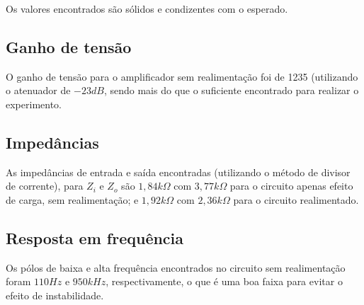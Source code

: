 \documentclass[openright]{normas-utf-tex} %
\begin{document}
Os valores encontrados são sólidos e condizentes com o esperado.

\subsection{Ganho de tensão}
\label{sec:ganho_tensao_transc}
O ganho de tensão para o amplificador sem realimentação foi de 1235 (utilizando o atenuador de $-23dB$, sendo mais do que o suficiente encontrado para realizar o experimento.

\subsection{Impedâncias}
As impedâncias de entrada e saída encontradas (utilizando o método de divisor de corrente), para $Z_i$ e $Z_o$ são $1,84k\Omega$ com $3,77k\Omega$ para o circuito apenas efeito de carga, sem realimentação; e $1,92k\Omega$ com $2,36k\Omega$ para o circuito realimentado.

\subsection{Resposta em frequência}
Os pólos de baixa e alta frequência encontrados no circuito sem realimentação foram $110Hz$ e $950kHz$, respectivamente, o que é uma boa faixa para evitar o efeito de instabilidade. 
\end{document}
